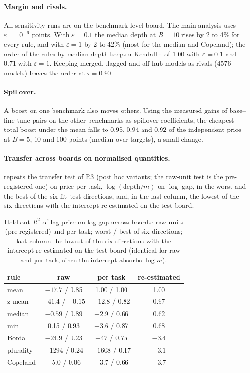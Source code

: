 \paragraph{Margin and rivals.}
All sensitivity runs are on the benchmark-level board. The main analysis uses $\varepsilon=10^{-6}$ points. With $\varepsilon=0.1$ the median depth at $B=10$ rises by 2 to 4\% for every rule, and with $\varepsilon=1$ by 2 to 42\% (most for the median and Copeland); the order of the rules by median depth keeps a Kendall $\tau$ of 1.00 with $\varepsilon=0.1$ and 0.71 with $\varepsilon=1$. Keeping merged, flagged and off-hub models as rivals (4576 models) leaves the order at $\tau=0.90$.

\paragraph{Spillover.}
A boost on one benchmark also moves others. Using the measured gains of base--fine-tune pairs on the other benchmarks as spillover coefficients, the cheapest total boost under the mean falls to 0.95, 0.94 and 0.92 of the independent price at $B=5$, 10 and 100 points (median over targets), a small change.

\paragraph{Transfer across boards on normalised quantities.}\label{app:r3norm}
 repeats the transfer test of R3 (post hoc variants; the raw-unit test is the pre-registered one) on price per task, $\log(\text{depth}/m)$ on $\log$ gap, in the worst and the best of the six fit--test directions, and, in the last column, the lowest of the six directions with the intercept re-estimated on the test board.

\begin{table}[h]
\centering
\caption{Held-out $R^2$ of log price on log gap across boards: raw units (pre-registered) and per task; worst / best of six directions; last column the lowest of the six directions with the intercept re-estimated on the test board (identical for raw and per task, since the intercept absorbs $\log m$).}
\label{tab:r3norm}
\small
\begin{tabular}{lccc}
\toprule
rule & raw & per task & re-estimated \\
\midrule
mean & $-17.7$ / 0.85 & 1.00 / 1.00 & 1.00 \\
z-mean & $-41.4$ / $-0.15$ & $-12.8$ / 0.82 & 0.97 \\
median & $-0.59$ / 0.89 & $-2.9$ / 0.66 & 0.62 \\
min & 0.15 / 0.93 & $-3.6$ / 0.87 & 0.68 \\
Borda & $-24.9$ / 0.23 & $-47$ / 0.75 & $-3.4$ \\
plurality & $-1294$ / 0.24 & $-1608$ / 0.17 & $-3.1$ \\
Copeland & $-5.0$ / 0.06 & $-3.7$ / 0.66 & $-3.7$ \\
\bottomrule
\end{tabular}
\end{table}

